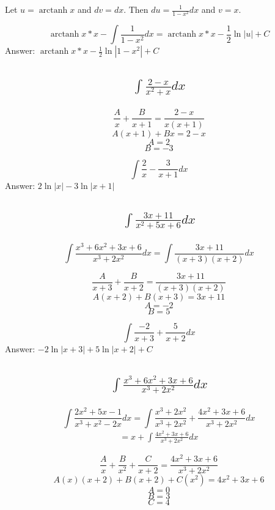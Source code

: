 \documentclass{article}
\DeclareMathOperator{\arctanh}{arctanh}
\begin{document}
Let $u = \arctanh{x}$ and $dv= dx$. Then $du = \frac{1}{1-x^2}dx$ and $v=x$. 

\[ \arctanh{x}*x- \int \frac{1}{1-x^2} dx = \arctanh{x}*x - \frac{1}{2} \ln{|u|} +C\]
Answer: $\arctanh{x}*x - \frac{1}{2} \ln{|1-x^2|} +C$


\subsection{
	\begin{align*}
		\int{\frac{2 - x}{x^2 + x} dx}
	\end{align*}
}

\[\frac{A}{x} + \frac{B}{x+1} = \frac{2-x}{x(x+1)} \]
\[A(x+1) +Bx = 2-x\]
\[A=2\]
\[B=-3\]

\bigskip

\[ \int \frac{2}{x} - \frac{3}{x+1} dx \]
Answer: $2\ln{|x|} - 3 \ln{|x+1|}$

\subsection{
	\begin{align*}
		\int{\frac{3x + 11}{x^2 + 5x + 6} dx}
	\end{align*}
}

\[ \int{\frac{x^3 + 6x^2 + 3x + 6}{x^3 + 2x^2} dx} = \int \frac{3x+11}{(x+3)(x+2)} dx\]

\bigskip

\[ \frac{A}{x+3} + \frac{B}{x+2} = \frac{3x+11}{(x+3)(x+2)} \]
\[ A(x+2) + B(x+3) = 3x+11\]
\[A = -2\]
\[B=5\]

\bigskip

\[ \int \frac{-2}{x+3} +\frac{5}{x+2} dx\]
Answer: $-2 \ln{|x+3|} +5 \ln {|x+2|} +C$


\subsection{
	\begin{align*}
		\int{\frac{x^3 + 6x^2 + 3x + 6}{x^3 + 2x^2} dx}
	\end{align*}
}

\[ \int{\frac{2x^2 + 5x - 1}{x^3 + x^2 - 2x} dx} = \int \frac{x^3+2x^2}{x^3+2x^2} + \frac{4x^2+3x +6}{x^3+2x^2} dx  \]
\begin{align*}
	= x+ \int \frac{4x^2+3x +6}{x^3+2x^2}dx
\end{align*}

\[ \frac{A}{x} + \frac{B}{x^2} +\frac{C}{x+2} = \frac{4x^2+3x +6}{x^3+2x^2} \]
\[A(x)(x+2)+B(x+2) +C(x^2) = 4x^2+3x +6\]
\[A=0\]
\[B=3\]
\[C = 4\]
\end{document}
